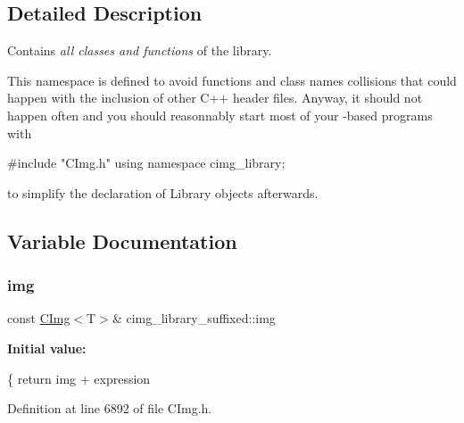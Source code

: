 \subsection{Detailed Description}
Contains {\itshape all classes and functions} of the  library. 

This namespace is defined to avoid functions and class names collisions that could happen with the inclusion of other C++ header files. Anyway, it should not happen often and you should reasonnably start most of your -\/based programs with 
\begin{DoxyCode}
\textcolor{preprocessor}{#include "CImg.h"}
\textcolor{keyword}{using namespace }cimg\_library;
\end{DoxyCode}
 to simplify the declaration of  Library objects afterwards. 

\subsection{Variable Documentation}
\mbox{\label{namespacecimg__library__suffixed_a4b2be1eebcd69c87bde0b5757cad1938}} 
\subsubsection{\texorpdfstring{img}{img}}
{\footnotesize\ttfamily const \hyperlink{structcimg__library__suffixed_1_1CImg}{C\+Img}$<$T$>$\& cimg\+\_\+library\+\_\+suffixed\+::img}

{\bfseries Initial value\+:}
\begin{DoxyCode}
\{
    \textcolor{keywordflow}{return} img + expression
\end{DoxyCode}


Definition at line 6892 of file C\+Img.\+h.

